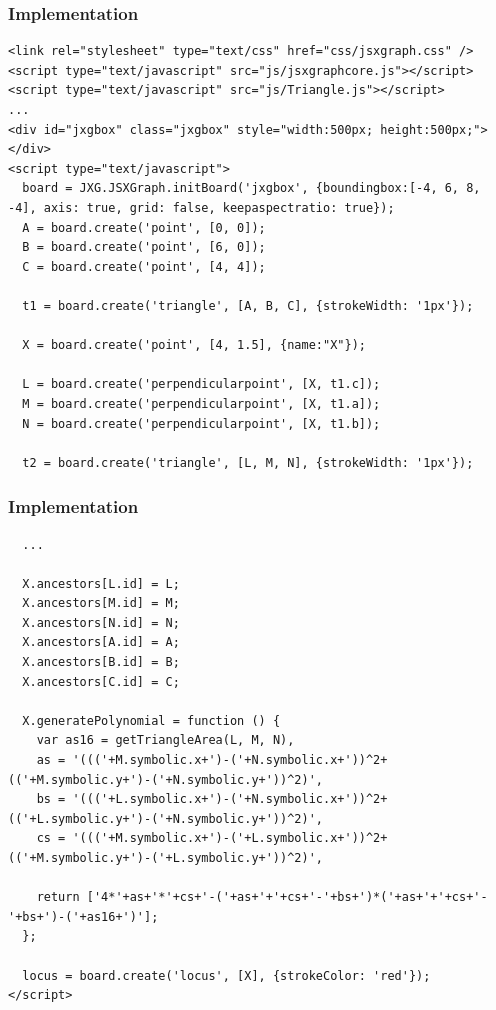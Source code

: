 \documentclass{beamer}
\begin{document}
\begin{frame}[fragile]
  \frametitle{Implementation}

  \begin{block}{}
    \begin{lstlisting}
<link rel="stylesheet" type="text/css" href="css/jsxgraph.css" />
<script type="text/javascript" src="js/jsxgraphcore.js"></script>
<script type="text/javascript" src="js/Triangle.js"></script>
...
<div id="jxgbox" class="jxgbox" style="width:500px; height:500px;"></div>
<script type="text/javascript">
  board = JXG.JSXGraph.initBoard('jxgbox', {boundingbox:[-4, 6, 8, -4], axis: true, grid: false, keepaspectratio: true});
  A = board.create('point', [0, 0]);
  B = board.create('point', [6, 0]);
  C = board.create('point', [4, 4]);

  t1 = board.create('triangle', [A, B, C], {strokeWidth: '1px'});

  X = board.create('point', [4, 1.5], {name:"X"});

  L = board.create('perpendicularpoint', [X, t1.c]);
  M = board.create('perpendicularpoint', [X, t1.a]);
  N = board.create('perpendicularpoint', [X, t1.b]);

  t2 = board.create('triangle', [L, M, N], {strokeWidth: '1px'});
    \end{lstlisting}
  \end{block}
\end{frame}


\begin{frame}[fragile]
  \frametitle{Implementation}

  \begin{block}{}
    \begin{lstlisting}
  ...

  X.ancestors[L.id] = L;
  X.ancestors[M.id] = M;
  X.ancestors[N.id] = N;
  X.ancestors[A.id] = A;
  X.ancestors[B.id] = B;
  X.ancestors[C.id] = C;

  X.generatePolynomial = function () {
    var as16 = getTriangleArea(L, M, N),
    as = '((('+M.symbolic.x+')-('+N.symbolic.x+'))^2+(('+M.symbolic.y+')-('+N.symbolic.y+'))^2)',
    bs = '((('+L.symbolic.x+')-('+N.symbolic.x+'))^2+(('+L.symbolic.y+')-('+N.symbolic.y+'))^2)',
    cs = '((('+M.symbolic.x+')-('+L.symbolic.x+'))^2+(('+M.symbolic.y+')-('+L.symbolic.y+'))^2)',

    return ['4*'+as+'*'+cs+'-('+as+'+'+cs+'-'+bs+')*('+as+'+'+cs+'-'+bs+')-('+as16+')'];
  };

  locus = board.create('locus', [X], {strokeColor: 'red'});
</script>
    \end{lstlisting}
  \end{block}
\end{frame}
\end{document}

